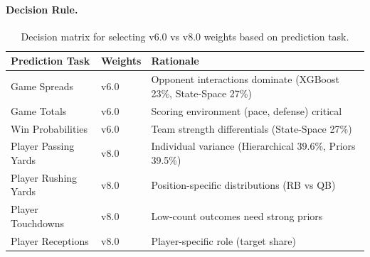 \paragraph{Decision Rule.}
\begin{table}[h]
\centering
\caption[Dual-weight decision matrix]{Decision matrix for selecting v6.0 vs v8.0 weights based on prediction task.}
\label{tab:dual-weight-decision}
\begin{tabular}{@{}lll@{}}
\toprule
\textbf{Prediction Task} & \textbf{Weights} & \textbf{Rationale} \\
\midrule
Game Spreads & v6.0 & Opponent interactions dominate (XGBoost 23\%, State-Space 27\%) \\
Game Totals & v6.0 & Scoring environment (pace, defense) critical \\
Win Probabilities & v6.0 & Team strength differentials (State-Space 27\%) \\
\midrule
Player Passing Yards & v8.0 & Individual variance (Hierarchical 39.6\%, Priors 39.5\%) \\
Player Rushing Yards & v8.0 & Position-specific distributions (RB vs QB) \\
Player Touchdowns & v8.0 & Low-count outcomes need strong priors \\
Player Receptions & v8.0 & Player-specific role (target share) \\
\bottomrule
\end{tabular}
\end{table}

